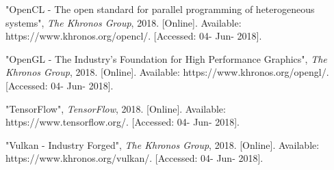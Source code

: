 \begin{thebibliography}{4}
{"OpenCL - The open standard for parallel programming of heterogeneous systems", \textit{The Khronos Group}, 2018. [Online]. Available: https://www.khronos.org/opencl/. [Accessed: 04- Jun- 2018].}

{"OpenGL - The Industry's Foundation for High Performance Graphics", \textit{The Khronos Group}, 2018. [Online]. Available: https://www.khronos.org/opengl/. [Accessed: 04- Jun- 2018].}

{"TensorFlow", \textit{TensorFlow}, 2018. [Online]. Available: https://www.tensorflow.org/. [Accessed: 04- Jun- 2018].}

{"Vulkan - Industry Forged", \textit{The Khronos Group}, 2018. [Online]. Available: https://www.khronos.org/vulkan/. [Accessed: 04- Jun- 2018].}

\end{thebibliography}

